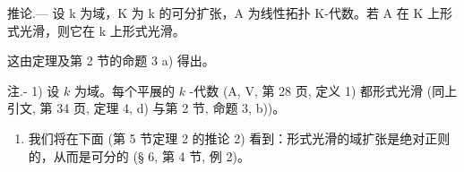 推论.--- 设 k 为域，K 为 k 的可分扩张，A 为线性拓扑 K-代数。若 A 在 K 上形式光滑，则它在 k 上形式光滑。

这由定理及第 2 节的命题 3 a) 得出。

注.- 1) 设 \(k\) 为域。每个平展的 \(k\) -代数 (A, V, 第 28 页, 定义 1) 都形式光滑 (同上引文, 第 34 页, 定理 4, d) 与第 2 节, 命题 3, b))。

\begin{enumerate}
\def\labelenumi{\arabic{enumi})}
\setcounter{enumi}{1}
\tightlist
\item
  我们将在下面 (第 5 节定理 2 的推论 2) 看到：形式光滑的域扩张是绝对正则的，从而是可分的 (§ 6, 第 4 节, 例 2)。
\end{enumerate}

